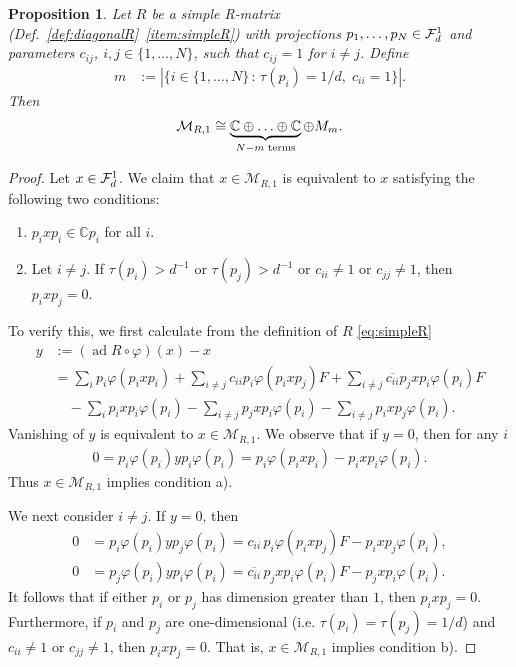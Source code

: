 \documentclass[12pt,a4paper]{amsart}
\numberwithin{equation}{section}
\newtheorem{proposition}[theorem]{Proposition}
\theoremstyle{remark}
\DeclareMathOperator{\ad}{ad}
\newcommand{\Cl}{\mathbb{C}}
\def\C{\mathbb{C}}
\newcommand{\CM}[0]{\mathcal{M}} \newcommand{\CN}[0]{\mathcal{N}}
\begin{document}
\begin{proposition}\label{prop:structureofMR1}
    Let $R$ be a simple R-matrix (Def.~\ref{def:diagonalR}~\ref{item:simpleR}) with projections $p_1,\ldots,p_N\in\mathcal{F}_d^1$ and parameters $c_{ij}$, $i,j\in\{1,\ldots,N\}$, such that $c_{ij}=1$ for $i\neq j$. Define 
    \begin{align*}
        m
        &:=
        \left|\{i\in\{1,\ldots,N\}\,:\,\tau(p_i)=1/d,\;c_{ii}=1\}\right|.
    \end{align*}
    Then
    \begin{align}\label{eq:structureofMR1fornormalforms}
     \CM_{R,1}
     \cong 
     \underbrace{\C\oplus\ldots\oplus\C}_{N-m\text{ \rm terms}} \oplus M_m.
    \end{align}
\end{proposition}
\begin{proof}
    Let $x\in\mathcal{F}_d^1$. We claim that $x\in\CM_{R,1}$ is equivalent to $x$ satisfying the following two conditions:
    \begin{enumerate}
        \item $p_ixp_i\in\Cl p_i$ for all $i$.
        \item Let $i\neq j$. If $\tau(p_i)>d^{-1}$ or $\tau(p_j)>d^{-1}$ or $c_{ii}\neq1$ or $c_{jj}\neq1$, then $p_ixp_j=0$.
    \end{enumerate}
    To verify this, we first calculate from the definition of $R$ \eqref{eq:simpleR}
    \begin{align*}
     y
     &:=(\ad R\circ\varphi)(x)-x
     \\
     &=
     \sum_i p_i\varphi(p_ixp_i)
     +
     \sum_{i\neq j} c_{ii} p_i\varphi(p_ixp_j)F
     +
     \sum_{i\neq j} \overline{c_{ii}} p_jxp_i\varphi(p_i)F
     \\
     &\quad
     -
     \sum_i p_ixp_i\varphi(p_i)
     -
     \sum_{i\neq j} p_jxp_i\varphi(p_i)
     -
     \sum_{i\neq j} p_ixp_j\varphi(p_i)
     .
    \end{align*}
    Vanishing of $y$ is equivalent to $x\in\CM_{R,1}$. We observe that if $y=0$, then for any $i$
    \begin{align*}
        0=
        p_i\varphi(p_i)yp_i\varphi(p_i)
        =
        p_i\varphi(p_ixp_i)-p_ixp_i\varphi(p_i).
    \end{align*}
    Thus $x\in\CM_{R,1}$ implies condition a).
    
    We next consider $i\neq j$. If $y=0$, then
    \begin{align*}
        0
        &=
        p_i\varphi(p_i)yp_j\varphi(p_i)
        =
        c_{ii}\,p_i\varphi(p_ixp_j)F-p_ixp_j\varphi(p_i),
        \\
        0
        &=
        p_j\varphi(p_i)yp_i\varphi(p_i)
        =
        \overline{c_{ii}}\,p_jxp_i\varphi(p_i)F-p_jxp_i\varphi(p_i).
    \end{align*}
    It follows that if either $p_i$ or $p_j$ has dimension greater than $1$, then $p_ixp_j=0$. Furthermore, if $p_i$ and $p_j$ are one-dimensional (i.e. $\tau(p_i)=\tau(p_j)=1/d$) and $c_{ii}\neq1$ or $c_{jj}\neq1$, then $p_ixp_j=0$. That is, $x\in\CM_{R,1}$ implies condition b). 
    

\end{proof}
\end{document}
